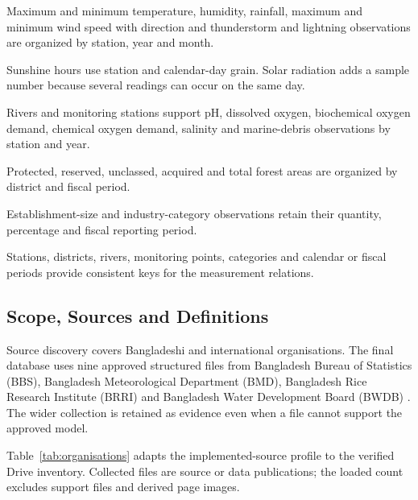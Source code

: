 \begin{description}[leftmargin=0.6cm,style=nextline]
  \item[Monthly climate records] Maximum and minimum temperature, humidity,
  rainfall, maximum and minimum wind speed with direction and thunderstorm and
  lightning observations are organized by station, year and month.
  \item[Daily climate records] Sunshine hours use station and calendar-day
  grain. Solar radiation adds a sample number because several readings can
  occur on the same day.
  \item[Hydrology and water quality] Rivers and monitoring stations support pH,
  dissolved oxygen, biochemical oxygen demand, chemical oxygen demand,
  salinity and marine-debris observations by station and year.
  \item[Forest area] Protected, reserved, unclassed, acquired and total forest
  areas are organized by district and fiscal period.
  \item[Industry] Establishment-size and industry-category observations retain
  their quantity, percentage and fiscal reporting period.
  \item[Reference and time data] Stations, districts, rivers, monitoring
  points, categories and calendar or fiscal periods provide consistent keys for
  the measurement relations.
\end{description}

\subsection{Scope, Sources and Definitions}
\label{subsec:sd}

Source discovery covers Bangladeshi and international organisations. The final
database uses nine approved structured files from Bangladesh Bureau of
Statistics (BBS), Bangladesh Meteorological Department (BMD), Bangladesh Rice
Research Institute (BRRI) and Bangladesh Water Development Board (BWDB)
\cite{bbs_env_ts,bmd_temperature,brri_daily,bwdb_rivers}. The wider collection
is retained as evidence even when a file cannot support the approved model.

Table~\ref{tab:organisations} adapts the implemented-source profile to the
verified Drive inventory. Collected files are source or data publications; the
loaded count excludes support files and derived page images.

